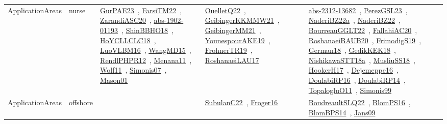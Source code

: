 {\begin{longtable}{lp{3cm}>{\raggedright\arraybackslash}p{6cm}>{\raggedright\arraybackslash}p{6cm}>{\raggedright\arraybackslash}p{8cm}}
ApplicationAreas & nurse & \href{../works/GurPAE23.pdf}{GurPAE23}~\cite{GurPAE23}, \href{../works/FarsiTM22.pdf}{FarsiTM22}~\cite{FarsiTM22}, \href{../works/ZarandiASC20.pdf}{ZarandiASC20}~\cite{ZarandiASC20}, \href{../works/abs-1902-01193.pdf}{abs-1902-01193}~\cite{abs-1902-01193}, \href{../works/ShinBBHO18.pdf}{ShinBBHO18}~\cite{ShinBBHO18}, \href{../works/HoYCLLCLC18.pdf}{HoYCLLCLC18}~\cite{HoYCLLCLC18}, \href{../works/LuoVLBM16.pdf}{LuoVLBM16}~\cite{LuoVLBM16}, \href{../works/WangMD15.pdf}{WangMD15}~\cite{WangMD15}, \href{../works/RendlPHPR12.pdf}{RendlPHPR12}~\cite{RendlPHPR12}, \href{../works/Menana11.pdf}{Menana11}~\cite{Menana11}, \href{../works/Wolf11.pdf}{Wolf11}~\cite{Wolf11}, \href{../works/Simonis07.pdf}{Simonis07}~\cite{Simonis07}, \href{../works/Mason01.pdf}{Mason01}~\cite{Mason01} & \href{../works/OuelletQ22.pdf}{OuelletQ22}~\cite{OuelletQ22}, \href{../works/GeibingerKKMMW21.pdf}{GeibingerKKMMW21}~\cite{GeibingerKKMMW21}, \href{../works/GeibingerMM21.pdf}{GeibingerMM21}~\cite{GeibingerMM21}, \href{../works/YounespourAKE19.pdf}{YounespourAKE19}~\cite{YounespourAKE19}, \href{../works/FrohnerTR19.pdf}{FrohnerTR19}~\cite{FrohnerTR19}, \href{../works/RoshanaeiLAU17.pdf}{RoshanaeiLAU17}~\cite{RoshanaeiLAU17} & \href{../works/abs-2312-13682.pdf}{abs-2312-13682}~\cite{abs-2312-13682}, \href{../works/PerezGSL23.pdf}{PerezGSL23}~\cite{PerezGSL23}, \href{../works/NaderiBZ22a.pdf}{NaderiBZ22a}~\cite{NaderiBZ22a}, \href{../works/NaderiBZ22.pdf}{NaderiBZ22}~\cite{NaderiBZ22}, \href{../works/BourreauGGLT22.pdf}{BourreauGGLT22}~\cite{BourreauGGLT22}, \href{../works/FallahiAC20.pdf}{FallahiAC20}~\cite{FallahiAC20}, \href{../works/RoshanaeiBAUB20.pdf}{RoshanaeiBAUB20}~\cite{RoshanaeiBAUB20}, \href{../works/FrimodigS19.pdf}{FrimodigS19}~\cite{FrimodigS19}, \href{../works/German18.pdf}{German18}~\cite{German18}, \href{../works/GedikKEK18.pdf}{GedikKEK18}~\cite{GedikKEK18}, \href{../works/NishikawaSTT18a.pdf}{NishikawaSTT18a}~\cite{NishikawaSTT18a}, \href{../works/MusliuSS18.pdf}{MusliuSS18}~\cite{MusliuSS18}, \href{../works/HookerH17.pdf}{HookerH17}~\cite{HookerH17}, \href{../works/Dejemeppe16.pdf}{Dejemeppe16}~\cite{Dejemeppe16}, \href{../works/DoulabiRP16.pdf}{DoulabiRP16}~\cite{DoulabiRP16}, \href{../works/DoulabiRP14.pdf}{DoulabiRP14}~\cite{DoulabiRP14}, \href{../works/TopalogluO11.pdf}{TopalogluO11}~\cite{TopalogluO11}, \href{../works/Simonis99.pdf}{Simonis99}~\cite{Simonis99}\\
ApplicationAreas & offshore &  & \href{../works/SubulanC22.pdf}{SubulanC22}~\cite{SubulanC22}, \href{../works/Froger16.pdf}{Froger16}~\cite{Froger16} & \href{../works/BoudreaultSLQ22.pdf}{BoudreaultSLQ22}~\cite{BoudreaultSLQ22}, \href{../works/BlomPS16.pdf}{BlomPS16}~\cite{BlomPS16}, \href{../works/BlomBPS14.pdf}{BlomBPS14}~\cite{BlomBPS14}, \href{../works/Jans09.pdf}{Jans09}~\cite{Jans09}\\

\end{longtable}}
